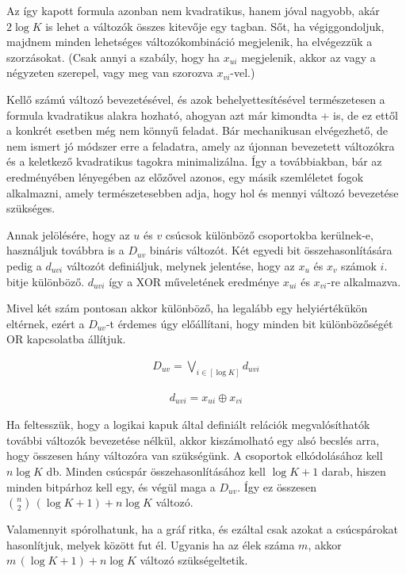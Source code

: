 Az így kapott formula azonban nem kvadratikus, hanem jóval nagyobb, akár $2 \log K$ is lehet a változók összes kitevője egy tagban. Sőt, ha végiggondoljuk, majdnem minden lehetséges változókombináció megjelenik, ha elvégezzük a szorzásokat. (Csak annyi a szabály, hogy ha $x_{ui}$ megjelenik, akkor az vagy a négyzeten szerepel, vagy meg van szorozva $x_{vi}$-vel.)

Kellő számú változó bevezetésével, és azok behelyettesítésével természetesen a formula kvadratikus alakra hozható, ahogyan azt már kimondta \az+ is, de ez ettől a konkrét esetben még nem könnyű feladat. Bár mechanikusan elvégezhető, de nem ismert jó módszer erre a feladatra, amely az újonnan bevezetett változókra és a keletkező kvadratikus tagokra minimalizálna. Így a továbbiakban, bár az eredményében lényegében az előzővel azonos, egy másik szemléletet fogok alkalmazni, amely természetesebben adja, hogy hol és mennyi változó bevezetése szükséges.

Annak jelölésére, hogy az $u$ és $v$ csúcsok különböző csoportokba kerülnek-e, használjuk továbbra is a $D_{uv}$ bináris változót. Két egyedi bit összehasonlítására pedig a $d_{uvi}$ változót definiáljuk, melynek jelentése, hogy az $x_u$ és $x_v$ számok $i.$ bitje különböző. $d_{uvi}$ így a XOR műveletének eredménye $x_{ui}$ és  $x_{vi}$-re alkalmazva.

Mivel két szám pontosan akkor különböző, ha legalább egy helyiértékükön eltérnek, ezért a $D_{uv}$-t érdemes úgy előállítani, hogy minden bit különbözőségét OR kapcsolatba állítjuk.

\begin{align}
	D_{uv} = \bigvee_{i \in [ \log K ] }{d_{uvi}}
\end{align}

\begin{align}
	d_{uvi} = x_{ui} \oplus x_{vi}
\end{align}

Ha feltesszük, hogy a logikai kapuk által definiált relációk megvalósíthatók további változók bevezetése nélkül, akkor kiszámolható egy alsó becslés arra, hogy összesen hány változóra van szükségünk. A csoportok elkódolásához kell $n \log K$ db. Minden csúcspár összehasonlításához kell $\log K + 1$ darab, hiszen minden bitpárhoz kell egy, és végül maga a $D_{uv}$. Így ez összesen $\binom{n}{2} \, ( \log K + 1 ) + n\log K$ változó.

Valamennyit spórolhatunk, ha a gráf ritka, és ezáltal csak azokat a csúcspárokat hasonlítjuk, melyek között fut él. Ugyanis ha az élek száma $m$, akkor $m \, ( \log K + 1 ) + n\log K$ változó szükségeltetik.

